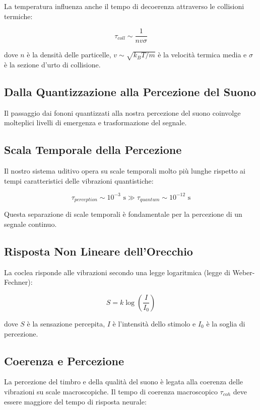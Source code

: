 \documentclass{gs-adonis}
\begin{document}
La temperatura influenza anche il tempo di decoerenza attraverso le
collisioni termiche:

\[\tau_{coll} \sim \frac{1}{nv\sigma}\]

dove \(n\) è la densità delle particelle, \(v \sim \sqrt{k_BT/m}\) è la
velocità termica media e \(\sigma\) è la sezione d'urto di collisione.

\subsection{Dalla Quantizzazione alla Percezione del
Suono}\label{dalla-quantizzazione-alla-percezione-del-suono}

Il passaggio dai fononi quantizzati alla nostra percezione del suono
coinvolge molteplici livelli di emergenza e trasformazione del segnale.

\subsection{Scala Temporale della
Percezione}\label{scala-temporale-della-percezione}

Il nostro sistema uditivo opera su scale temporali molto più lunghe
rispetto ai tempi caratteristici delle vibrazioni quantistiche:

\[\tau_{perception} \sim 10^{-3} \text{ s} \gg \tau_{quantum} \sim 10^{-12} \text{ s}\]

Questa separazione di scale temporali è fondamentale per la percezione
di un segnale continuo.

\subsection{Risposta Non Lineare
dell'Orecchio}\label{risposta-non-lineare-dellorecchio}

La coclea risponde alle vibrazioni secondo una legge logaritmica (legge
di Weber-Fechner):

\[S = k \log\left(\frac{I}{I_0}\right)\]

dove \(S\) è la sensazione percepita, \(I\) è l'intensità dello stimolo
e \(I_0\) è la soglia di percezione.

\subsection{Coerenza e Percezione}\label{coerenza-e-percezione}

La percezione del timbro e della qualità del suono è legata alla
coerenza delle vibrazioni su scale macroscopiche. Il tempo di coerenza
macroscopico \(\tau_{coh}\) deve essere maggiore del tempo di risposta
neurale:
\end{document}
